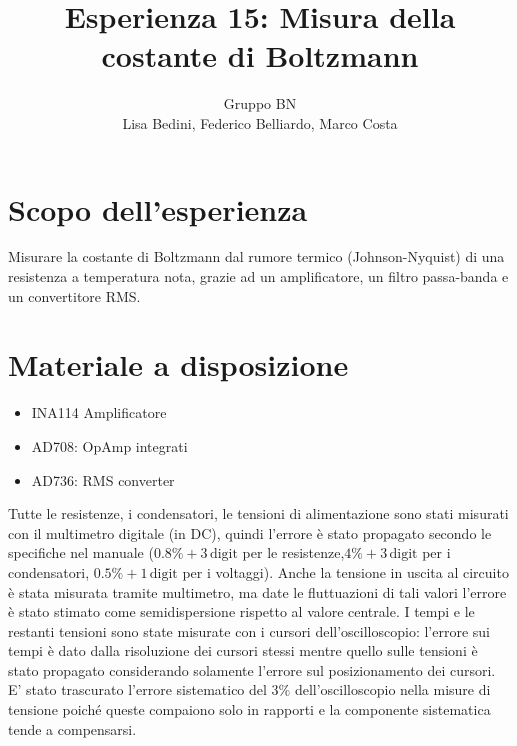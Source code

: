 \documentclass[10pt,a4paper]{article}
\author{Gruppo BN \\Lisa Bedini,  Federico Belliardo, Marco Costa}
\title{Esperienza 15: Misura della costante di Boltzmann}
\begin{document}
\maketitle
\section{Scopo dell'esperienza}
Misurare la costante di Boltzmann dal rumore termico (Johnson-Nyquist) di una resistenza a temperatura nota, grazie ad un amplificatore, un filtro passa-banda e un convertitore RMS.

\section{Materiale a disposizione}
\begin{itemize}
\item INA114 Amplificatore
\item AD708: OpAmp integrati
\item AD736: RMS converter
\end{itemize}

Tutte le resistenze, i condensatori, le tensioni di alimentazione sono stati misurati con il multimetro digitale (in DC), quindi l'errore è stato propagato secondo le specifiche nel manuale ($0.8\% + 3\,\mbox{digit}$ per le resistenze,$4\% + 3\, \mbox{digit}$  per i condensatori, $0.5\% + 1\,\mbox{digit}$ per i voltaggi).
Anche la tensione in uscita al circuito è stata misurata tramite multimetro, ma date le fluttuazioni di tali valori l'errore è stato stimato come semidispersione rispetto al valore centrale. I tempi e le restanti tensioni sono state misurate con i cursori dell'oscilloscopio: l'errore sui tempi è dato dalla risoluzione dei cursori stessi mentre quello sulle tensioni è stato propagato considerando solamente l'errore sul posizionamento dei cursori. E' stato trascurato l'errore sistematico del $3\%$ dell'oscilloscopio nella misure di tensione poiché queste compaiono solo in rapporti e la componente sistematica tende a compensarsi.

\end{document}
